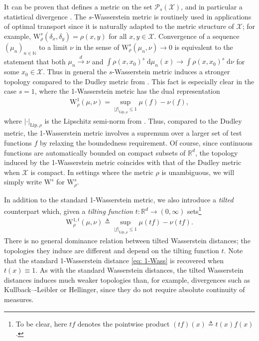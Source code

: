 \documentclass[12pt,paper=letter]{scrreprt}
\def\defeq{\triangleq} %
\def\defined{\defeq} %
\begin{document}
\noindent It can be proven that  defines a metric on the set $\mathcal{P}_s(\mathcal{X})$, and in particular a statistical divergence \citep{clement2008elementary}.
The $s$-Wasserstein metric is routinely used in applications of optimal transport since it is naturally adapted to the metric structure of $\mathcal{X}$; for example, $\mathrm{W}_\rho^s(\delta_x, \delta_y) = \rho(x,y)$ for all $x,y \in \mathcal{X}$.
Convergence of a sequence $(\mu_n)_{n \in \mathbb{N}}$ to a limit $\nu$ in the sense of $\mathrm{W}_\rho^s(\mu_n,\nu) \rightarrow 0$ is equivalent to the statement that both $\mu_n \stackrel{d}{\rightarrow} \nu$ and $\int \rho(x,x_0)^s \; \mathrm{d}\mu_n(x) \rightarrow \int \rho(x,x_0)^s \; \mathrm{d}\nu$ for some $x_0 \in \mathcal{X}$.
Thus in general the $s$-Wasserstein metric induces a stronger topology compared to the Dudley metric from .
This fact is especially clear in the case $s = 1$, where the 1-Wasserstein metric has the dual representation
\begin{align}
\mathrm{W}_\rho^1(\mu,\nu) = \sup_{|f|_{\text{Lip},\rho} \leq 1} \mu(f) - \nu(f) , \label{eq: 1-Wass}
\end{align}
where $|\cdot|_{\text{Lip},\rho}$ is the Lipschitz semi-norm from .
Thus, compared to the Dudley metric, the 1-Wasserstein metric involves a supremum over a larger set of test functions $f$ by relaxing the boundedness requirement.
Of course, since continuous functions are automatically bounded on compact subsets of $\mathbb{R}^d$, the topology induced by the 1-Wasserstein metric coincides with that of the Dudley metric when $\mathcal{X}$ is compact.
In settings where the metric $\rho$ is unambiguous, we will simply write $\mathrm{W}^s$ for $\mathrm{W}_\rho^s$.

In addition to the standard 1-Wasserstein metric, we also introduce a \emph{tilted} counterpart which, given a \emph{tilting function} $t : \mathbb{R}^d \rightarrow (0 , \infty)$ sets\footnote{To be clear, here $t f$ denotes the pointwise product $(tf)(x) \defined t(x) f(x)$.}
\begin{align*}
\mathrm{W}_\rho^{1,t}(\mu,\nu) \defined \sup_{|f|_{\mathrm{Lip},\rho} \leq 1} \mu(t f) - \nu(t f) . 
\end{align*}
There is no general dominance relation between tilted Wasserstein distances; the topologies they induce are different and depend on the tilting function $t$.
Note that the standard 1-Wasserstein distance \eqref{eq: 1-Wass} is recovered when $t(x) \equiv 1$. 
As with the standard Wasserstein distances, the tilted Wasserstein distances induces much weaker topologies than, for example, divergences such as Kullback–-Leibler or Hellinger, since they do not require absolute continuity of measures.
\end{document}
